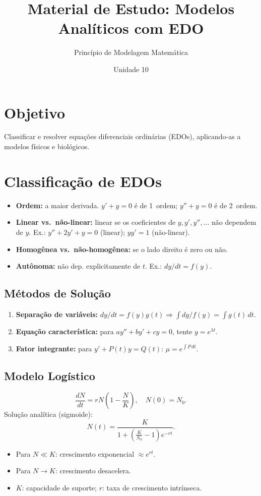 \documentclass[12pt,a4paper]{article}
\title{Material de Estudo: Modelos Anal\'iticos com EDO}
\author{Princ\'ipio de Modelagem Matem\'atica}
\date{Unidade 10}
\begin{document}
\maketitle

\section*{Objetivo}
Classificar e resolver equa\c{c}\~oes diferenciais ordin\'arias (EDOs), aplicando-as a modelos f\'isicos e biol\'ogicos.

\section*{Classifica\c{c}\~ao de EDOs}
\begin{itemize}
  \item \textbf{Ordem:} a maior derivada. $y' + y = 0$ \'e de 1\textordfeminine\ ordem; $y'' + y = 0$ \'e de 2\textordfeminine\ ordem.
  \item \textbf{Linear vs.\ n\~ao-linear:} linear se os coeficientes de $y, y', y'',\ldots$ n\~ao dependem de $y$. Ex.: $y'' + 2y' + y = 0$ (linear); $yy' = 1$ (n\~ao-linear).
  \item \textbf{Homog\^enea vs.\ n\~ao-homog\^enea:} se o lado direito \'e zero ou n\~ao.
  \item \textbf{Aut\^onoma:} n\~ao dep. explicitamente de $t$. Ex.: $dy/dt = f(y)$.
\end{itemize}

\subsection*{M\'etodos de Solu\c{c}\~ao}
\begin{enumerate}
  \item \textbf{Separa\c{c}\~ao de vari\'aveis:} $dy/dt = f(y)g(t) \Rightarrow \int dy/f(y) = \int g(t)\,dt$.
  \item \textbf{Equa\c{c}\~ao caracter\'istica:} para $ay'' + by' + cy = 0$, tente $y = e^{\lambda t}$.
  \item \textbf{Fator integrante:} para $y' + P(t)y = Q(t)$: $\mu = e^{\int P\,dt}$.
\end{enumerate}

\subsection*{Modelo Log\'istico}
\[
\frac{dN}{dt} = rN\!\left(1-\frac{N}{K}\right), \quad N(0)=N_0.
\]
Solu\c{c}\~ao anal\'itica (sigmoide):
\[
N(t) = \frac{K}{1 + \left(\frac{K}{N_0}-1\right)e^{-rt}}.
\]
\begin{itemize}
  \item Para $N \ll K$: crescimento exponencial $\approx e^{rt}$.
  \item Para $N \to K$: crescimento desacelera.
  \item $K$: capacidade de suporte; $r$: taxa de crescimento intr\'inseca.
\end{itemize}
\end{document}
